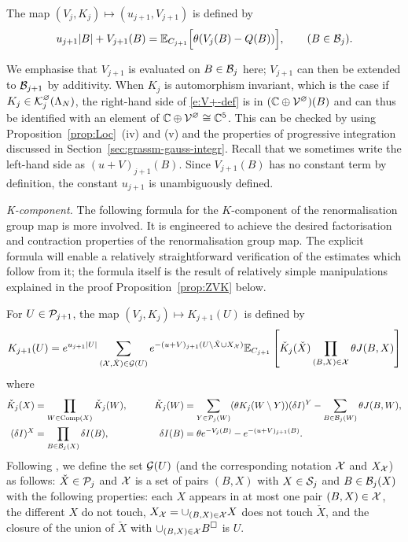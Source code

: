 \documentclass[11pt]{amsart}
\numberwithin{equation}{section}
\numberwithin{theorem}{section}
\newcommand{\1}{{\bf 1}}
\newcommand{\Comp}{\operatorname{Comp}}
\newcommand{\cVbulk}{\cV^\varnothing}
\newcommand{\cKbulk}{\cK^\varnothing}
\begin{document}
\begin{definition} \label{def:V+}
The map $(V_j,K_j) \mapsto (u_{j+1},V_{j+1})$ is defined by
\begin{equation} \label{e:V+-def}
  u_{j+1}|B| + V_{j+1}(B) = 
  \mathbb{E}_{C_{j+1}}\Bigl[{\theta ({V_j(B) - Q(B)})}\Bigr], \qquad (B\in\mathcal B_{j}).
\end{equation}
\end{definition}

We emphasise that $V_{j+1}$ is evaluated on $B\in\mathcal B_j$
here; $V_{j+1}$ can then be
extended to $\mathcal B_{j+1}$ by additivity.  When $K_{j}$ is automorphism
invariant, which is the case if $K_{j}\in\cKbulk_{j}(\Lambda_{N})$,
the right-hand side of \eqref{e:V+-def} is in $(\C\oplus\cVbulk)(B)$
and can thus be identified with an element of
$\C\oplus\cVbulk \cong \C^5$.  This can be checked by using
Proposition~\ref{prop:Loc}~(iv) and (v) and the properties of
progressive integration discussed in
Section~\ref{sec:grassm-gauss-integr}.  Recall that we sometimes write
the left-hand side as $(u+V)_{j+1}(B)$. Since $V_{j+1}(B)$ has no
constant term by definition, the constant $u_{j+1}$ is unambiguously defined.

\medskip
\noindent
\emph{K-component.}  The following formula for the
  $K$-component of the renormalisation group map is more involved.  It
  is engineered to achieve the desired factorisation and contraction
  properties of the renormalisation group map.  The explicit formula
  will enable a relatively straightforward verification of the
  estimates which follow from it; the formula itself is the result of
  relatively simple manipulations explained in the proof
  Proposition~\ref{prop:ZVK} below.

\begin{definition} \label{def:K+}
For $U \in \mathcal P_{j+1}$,
the map $(V_j,K_j) \mapsto K_{j+1}(U)$  is defined by
\begin{equation} \label{e:K+-def}
  K_{j+1}(U)=
  e^{u_{j+1}|U|}
  \sum_{(\mathcal X,\check{X}) \in \mathcal G(U)}  e^{-(u+V)_{j+1}(U \setminus
    \check{X} \cup X_{\mathcal X})} \mathbb{E}_{C_{j+1}} \left[{ \check{K}_j(\check{X})
  \prod_{(B,X) \in \mathcal X}\theta J(B,X)}\right]
\end{equation}
where 
\begin{alignat}{2} \label{e:K+-def2}
  \check{K}_{j}(X) &= \prod_{W \in \Comp(X)}
  \check{K}_{j}(W),
  &\qquad
  \check{K}_{j}(W)
  &= 
    \sum_{Y \in \cP_j(W)} (\theta K_j(W\setminus Y)) (\delta I)^Y
    - \sum_{B\in \cB_j(W)} \theta J(B, W),
    \\
    \label{e:deltaI}
  (\delta I)^X &= \prod_{B \in \cB_j(X)} \delta I(B), &\qquad
  \delta I(B) &= \theta e^{-V_j(B)}-e^{-(u+V)_{j+1}(B)}.
\end{alignat}
Following \cite[Section~5.1.2]{MR2523458}, we define the set $\mathcal G(U)$ (and the corresponding notation $\mathcal X$ and $X_{\mathcal X}$) as follows:
$\check{X}\in\mathcal P_j$ and $\mathcal X$ is a set of pairs $(B,X)$ with
$X \in \mathcal S_j$ and $B \in \mathcal B_j(X)$ with the following properties:
each $X$ appears in at most one pair $(B,X)\in \mathcal X$,
the different $X$ do not touch, $X_{\mathcal X}= \cup_{(B,X)\in\mathcal X} X$
does not touch $\check{X}$,
and the closure of the union of $\check{X}$ with $\cup_{(B,X)\in \mathcal X} B^\square$ is $U$.
\end{definition}
\end{document}
